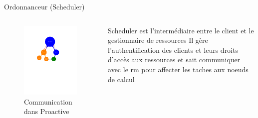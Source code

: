 \documentclass{beamer}
\begin{document}
\begin{frame}{Ordonnanceur (Scheduler)}
	\begin{columns}
	\begin{column}[l]{0.5\linewidth}
        \begin{figure}
            \centering
            \includegraphics[trim=4cm 13cm 2cm 5cm,scale=0.48]{submit.pdf}
            \caption{Communication dans Proactive}
        \end{figure}
	\end{column}
	\begin{column}[r]{0.5\linewidth}
        \begin{block}{Scheduler}
             est l'intermédiaire entre le client et le gestionnaire de ressources
             Il gère l'authentification des clients et leurs droits d'accès aux ressources 
             et sait communiquer avec le rm pour affecter les taches aux noeuds de calcul
        \end{block}
        
	\end{column}
	\end{columns}
    
\end{frame}
\end{document}
